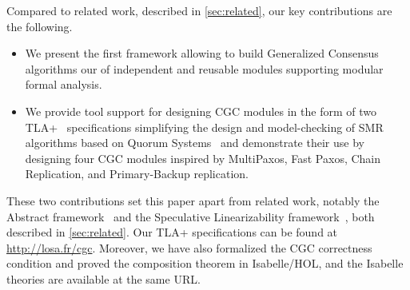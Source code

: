Compared to related work, described in \cref{sec:related}, our key contributions are the following.
\begin{itemize}
    \item We present the first framework allowing to build Generalized Consensus algorithms our of independent and reusable modules supporting modular formal analysis.
    \item We provide tool support for designing CGC modules in the form of two TLA+~\cite{Lamport02SpecifyingSystems} specifications simplifying the design and model-checking of SMR algorithms based on Quorum Systems~\cite{GuerraouiVukolic10RefinedQuorumSystems} and demonstrate their use by designing four CGC modules inspired by MultiPaxos, Fast Paxos, Chain Replication, and Primary-Backup replication.
\end{itemize}
These two contributions set this paper apart from related work, notably the Abstract framework~\cite{GuerraouiETAL10Next700BftProtocols} and the Speculative Linearizability framework~\cite{GuerraouiKuncakLosa12SpeculativeLinearizability}, both described in \cref{sec:related}.
Our TLA+ specifications can be found at \url{http://losa.fr/cgc}.
Moreover, we have also formalized the CGC correctness condition and proved the composition theorem in Isabelle/HOL\@, and the Isabelle theories are available at the same URL\@.
